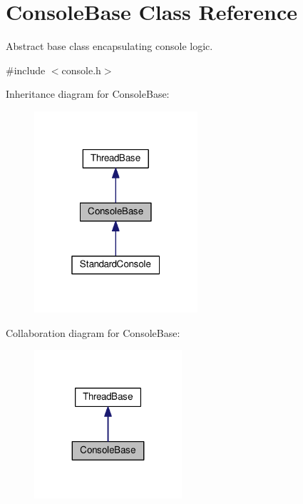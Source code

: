 \hypertarget{classConsoleBase}{}\section{Console\+Base Class Reference}
\label{classConsoleBase}


Abstract base class encapsulating console logic.  




{\ttfamily \#include $<$console.\+h$>$}



Inheritance diagram for Console\+Base\+:
\nopagebreak
\begin{figure}[H]
\begin{center}
\leavevmode
\includegraphics[width=172pt]{d1/d77/classConsoleBase__inherit__graph}
\end{center}
\end{figure}


Collaboration diagram for Console\+Base\+:
\nopagebreak
\begin{figure}[H]
\begin{center}
\leavevmode
\includegraphics[width=155pt]{d7/dde/classConsoleBase__coll__graph}
\end{center}
\end{figure}
